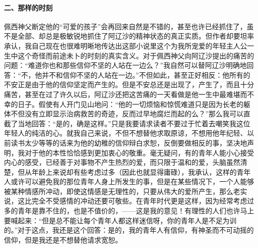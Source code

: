 \paragraph*{二、那样的时刻}
\par 佩西神父断定他的“可爱的孩子”会再回来自然是不错的，甚至也许已经抓住了，虽不是全部、却总是极敏锐地抓住了阿辽沙的精神状态的真正实质。但作者却要坦率承认，我自己现在也很难明晰地传达出这部小说里这个为我所宠爱的年轻主人公一生中这个奇怪而前途未卜的时刻的真实含义。对于佩西神父向阿辽沙提出的痛苦的问题：“难道你也和那些信仰不坚的人站在一边么？”我自然可以替阿辽沙明确地回答：“不，他并不和信仰不坚的人站在一边。”不但如此，甚至正好相反：他所有的不安正是由于他的信仰坚定而产生的。但是不安总还是出现了，产生了，而且十分痛苦，甚至在过了许久以后，阿辽沙还把这苦痛的一天看做是他一生中最难堪而不幸的日子。假使有人开门见山地问：“他的一切烦恼和惊慌难道只是因为长老的躯体不但没有立即显示治病救苦的奇迹，反而过早地腐烂而起的么？”那么我可以直截了当地回答：“是的，确是这样。”只是我要请求读者不要过于忙着去嘲笑我这位年轻人的纯洁的心。就我自己来说，不但不想替他求取原谅，不想用他年纪轻、以前读书太少等等的话来为他的幼稚的信仰辩白求恕，反倒要做相反的事，坚决地声明，我对于他的本性恰恰感到更加衷心的敬重。毫无疑问，有的青年人能小心接受内心的感受，已经善于对事物不产生热烈的爱，而只限于温和的爱，头脑虽然清楚，但从年龄上来说却有些考虑过多（因此也就显得庸碌），我承认，这样的青年人或许可以避免我的那位青年人身上所发生的事，但是在某些情况下，一个人能够被某种情感所冲动，即使这情感是无理性的，只要从伟大的爱所产生，那么老实说，这比完全不受感情的冲动还要可敬些。在青年时代更是这样，因为经常考虑过多的青年是靠不住的，也是不值价的，——这是我的意见！有理性的人们也许马上要喊起来：“但是总不能让每个青年人都这样迷信呀，你的青年人是不足为训的。”对于这点，我还是这个回答：是的，我的青年人有信仰，有神圣而不可动摇的信仰，但是我还是不想替他请求宽恕。
